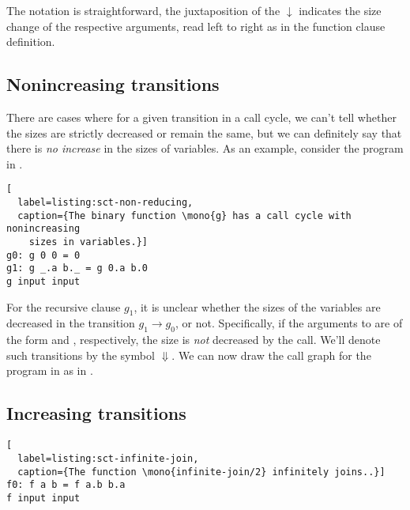 The notation is straightforward, the juxtaposition of the $\downarrow$
indicates the size change of the respective arguments, read left to right as in
the function clause definition.

\subsection{Nonincreasing transitions}

There are cases where for a given transition in a call cycle, we can't tell
whether the sizes are strictly decreased or remain the same, but we can
definitely say that there is \emph{no increase} in the sizes of variables. As
an example, consider the program in .

\begin{lstlisting}[
  label=listing:sct-non-reducing,
  caption={The binary function \mono{g} has a call cycle with nonincreasing
    sizes in variables.}]
g0: g 0 0 = 0
g1: g _.a b._ = g 0.a b.0
g input input
\end{lstlisting}


For the recursive clause $g_1$, it is unclear whether the sizes of the
variables are decreased in the transition $g_1\rightarrow g_0$, or not.
Specifically, if the arguments to  are of the form  and
, respectively, the size is \emph{not} decreased by the call. We'll
denote such transitions by the symbol $\Downarrow$. We can now draw the call
graph for the program in  as in
.



\subsection{Increasing transitions}




\begin{lstlisting}[
  label=listing:sct-infinite-join,
  caption={The function \mono{infinite-join/2} infinitely joins..}]
f0: f a b = f a.b b.a
f input input
\end{lstlisting}



